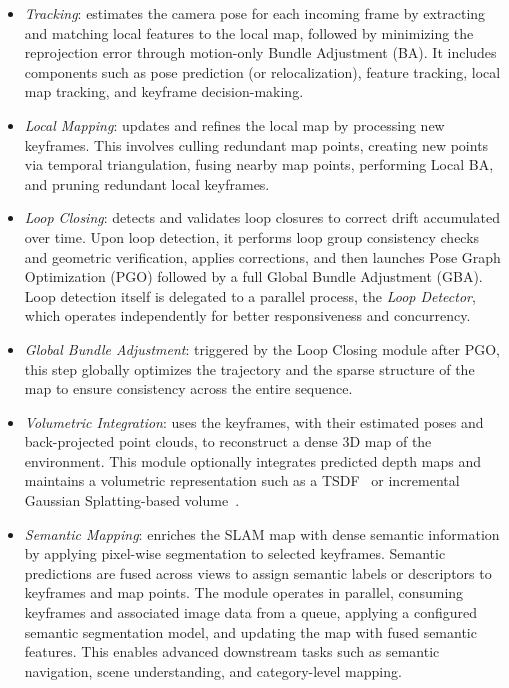 \documentclass{article}
\begin{document}
\begin{itemize}
\item \textit{Tracking}: estimates the camera pose for each incoming frame by extracting and matching local features to the local map, followed by minimizing the reprojection error through motion-only Bundle Adjustment (BA). It includes components such as pose prediction (or relocalization), feature tracking, local map tracking, and keyframe decision-making.
\item \textit{Local Mapping}: updates and refines the local map by processing new keyframes. This involves culling redundant map points, creating new points via temporal triangulation, fusing nearby map points, performing Local BA, and pruning redundant local keyframes.
\item \textit{Loop Closing}: detects and validates loop closures to correct drift accumulated over time. Upon loop detection, it performs loop group consistency checks and geometric verification, applies corrections, and then launches Pose Graph Optimization (PGO) followed by a full Global Bundle Adjustment (GBA). Loop detection itself is delegated to a parallel process, the \textit{Loop Detector}, which operates independently for better responsiveness and concurrency.
\item \textit{Global Bundle Adjustment}: triggered by the Loop Closing module after PGO, this step globally optimizes the trajectory and the sparse structure of the map to ensure consistency across the entire sequence.
\item \textit{Volumetric Integration}: uses the keyframes, with their estimated poses and back-projected point clouds, to reconstruct a dense 3D map of the environment. This module optionally integrates predicted depth maps and maintains a volumetric representation such as a TSDF~\cite{dong2022ash} or incremental Gaussian Splatting-based volume~\cite{matsuki2023gaussian,kerbl20233d}.
\item \textit{Semantic Mapping}: enriches the SLAM map with dense semantic information by applying pixel-wise segmentation to selected keyframes. Semantic predictions are fused across views to assign semantic labels or descriptors to keyframes and map points. The module operates in parallel, consuming keyframes and associated image data from a queue, applying a configured semantic segmentation model, and updating the map with fused semantic features. This enables advanced downstream tasks such as semantic navigation, scene understanding, and category-level mapping.
\end{itemize}
\end{document}
